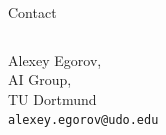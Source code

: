 \begin{columns}[t, onlytextwidth]
\begin{column}{0.30\textwidth}
\begin{block}[equal height group=bottom]{\normalsize Contact}
\begin{columns}[T]
        \begin{column}{0.3\textwidth}
              \footnotesize
                  \vspace*{0.5cm}
                  Alexey Egorov, \\
                  AI Group, \\
                  TU Dortmund \\
                  \texttt{alexey.egorov@udo.edu}
        \end{column}
      \end{columns}


\end{block}
\end{column}
\end{columns}
